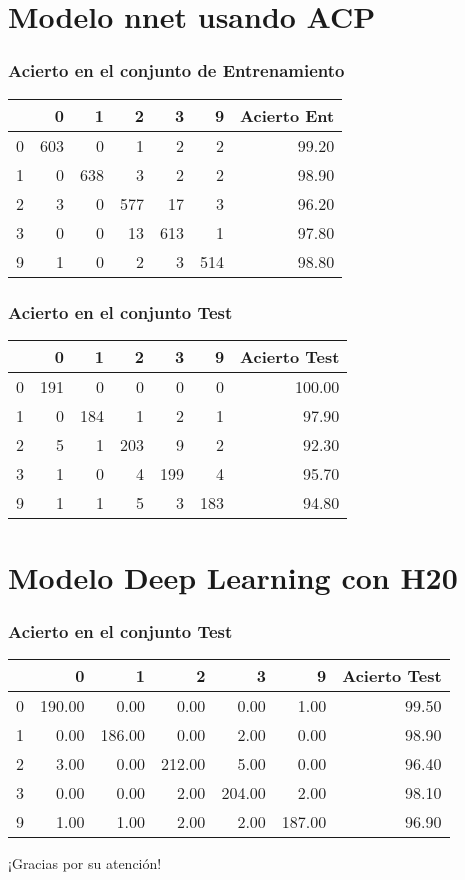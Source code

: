 \documentclass{beamer}
\theoremstyle{definition}
\begin{document}
\section{Modelo nnet usando ACP}


\begin{frame}
\frametitle{Acierto en el conjunto de Entrenamiento}
\begin{table}[ht]
\centering
\begin{tabular}{rrrrrrr}
  \hline
 & 0 & 1 & 2 & 3 & 9 & Acierto Ent \\ 
  \hline
0 & 603 & 0 & 1 & 2 & 2 & 99.20 \\ 
  1 & 0 & 638 & 3 & 2 & 2 & 98.90 \\ 
  2 & 3 & 0 & 577 & 17 & 3 & 96.20 \\ 
  3 & 0 & 0 & 13 & 613 & 1 & 97.80 \\ 
  9 & 1 & 0 & 2 & 3 & 514 & 98.80 \\ 
   \hline
\end{tabular}
\end{table}
\end{frame}



\begin{frame}
\frametitle{Acierto en el conjunto Test}
\begin{table}[ht]
\centering
\begin{tabular}{rrrrrrr}
  \hline
 & 0 & 1 & 2 & 3 & 9 & Acierto Test \\ 
  \hline
0 & 191 & 0 & 0 & 0 & 0 & 100.00 \\ 
  1 & 0 & 184 & 1 & 2 & 1 & 97.90 \\ 
  2 & 5 & 1 & 203 & 9 & 2 & 92.30 \\ 
  3 & 1 & 0 & 4 & 199 & 4 & 95.70 \\ 
  9 & 1 & 1 & 5 & 3 & 183 & 94.80 \\ 
   \hline
\end{tabular}
\end{table}
\end{frame}


\section{Modelo Deep Learning con H20}

\begin{frame}
\frametitle{Acierto en el conjunto Test}
\begin{table}[ht]
\centering
\begin{tabular}{rrrrrrr}
  \hline
 & 0 & 1 & 2 & 3 & 9 & Acierto Test \\ 
  \hline
0 & 190.00 & 0.00 & 0.00 & 0.00 & 1.00 & 99.50 \\ 
  1 & 0.00 & 186.00 & 0.00 & 2.00 & 0.00 & 98.90 \\ 
  2 & 3.00 & 0.00 & 212.00 & 5.00 & 0.00 & 96.40 \\ 
  3 & 0.00 & 0.00 & 2.00 & 204.00 & 2.00 & 98.10 \\ 
  9 & 1.00 & 1.00 & 2.00 & 2.00 & 187.00 & 96.90 \\ 
   \hline
\end{tabular}
\end{table}
\end{frame}

\begin{frame}
\begin{center}
\huge{¡Gracias por su atención!}
\end{center} 
\end{frame}
\end{document}
